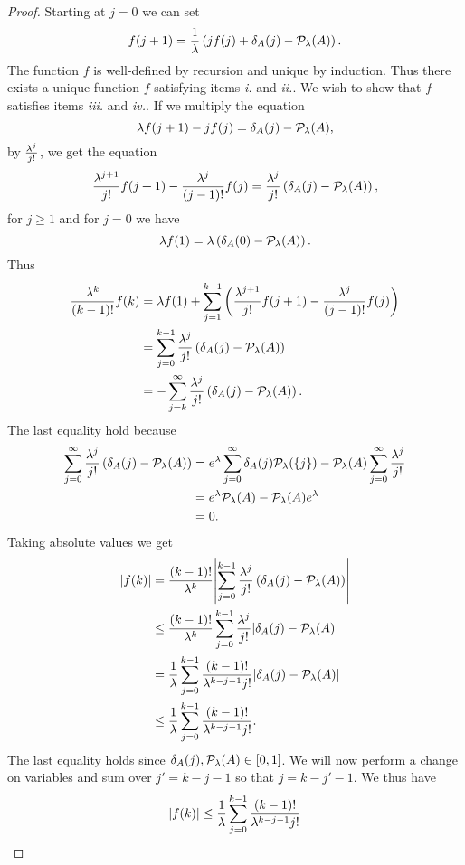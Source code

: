 \begin{proof}
    Starting at $j=0$ we can set 
    \[f(j+1) = \frac{1}{\lambda} \left(j f(j) +\delta_A(j)-{\mathcal{P}}_\lambda(A)\right). \]
    The function $f$ is well-defined by recursion and unique by induction. Thus there exists a unique function $f$ satisfying items \emph{i.} and \emph{ii.}. We wish to show that $f$ satisfies items \emph{iii.} and \emph{iv.}. If we multiply the equation 
    \[ \lambda f(j+1)-jf(j) = \delta_A(j)-{\mathcal{P}}_\lambda(A),\]
    by $\frac{\lambda^j}{j!}$, we get the equation 
    \[\frac{\lambda^{j+1}}{j!}f(j+1) - \frac{\lambda^j}{(j-1)!}f(j) = \frac{\lambda^j}{j!}\left(\delta_A(j)-{\mathcal{P}}_\lambda(A)\right), \]
    for $j \ge 1$ and for $j=0$ we have
    \[\lambda f(1)=\lambda \left(\delta_A(0)-{\mathcal{P}}_\lambda(A)\right). \]
    Thus 
    \begin{align*}
        \frac{\lambda^k}{(k-1)!}f(k)&=\lambda f(1)+\sum_{j=1}^{k-1} \left(\frac{\lambda^{j+1}}{j!}f(j+1)-\frac{\lambda^j}{(j-1)!} f(j)\right)\\
        &=\sum_{j=0}^{k-1} \frac{\lambda^j}{j!}\left(\delta_A(j)-{\mathcal{P}}_\lambda(A)\right)\\
        &=-\sum_{j=k}^\infty \frac{\lambda^j}{j!}\left(\delta_A(j)-{\mathcal{P}}_\lambda(A)\right).
    \end{align*}
    The last equality hold because  
    \begin{align*}
        \sum_{j=0}^\infty \frac{\lambda^j}{j!}\left(\delta_A(j)-{\mathcal{P}}_\lambda(A)\right)&=e^\lambda \sum_{j=0}^\infty \delta_A(j){\mathcal{P}}_\lambda(\{j\}) - {\mathcal{P}}_\lambda(A)\sum_{j=0}^\infty \frac{\lambda^j}{j!}\\
        &=e^\lambda {\mathcal{P}}_\lambda(A) - {\mathcal{P}}_\lambda(A)e^{\lambda}\\
        &=0.
    \end{align*}
    Taking absolute values we get
    \begin{align*}
        {\left\lvert f(k)\right\rvert} &= \frac{(k-1)!}{\lambda^k}{\left\lvert\sum_{j=0}^{k-1}\frac{\lambda^j}{j!}\left(\delta_A(j)-{\mathcal{P}}_\lambda(A)\right)\right\rvert}\\
        &\le\frac{(k-1)!}{\lambda^k}\sum_{j=0}^{k-1}\frac{\lambda^j}{j!}{\left\lvert\delta_A(j)-{\mathcal{P}}_\lambda(A)\right\rvert}\\
        &=\frac{1}{\lambda}\sum_{j=0}^{k-1}\frac{(k-1)!}{\lambda^{k-j-1}j!}{\left\lvert\delta_A(j)-{\mathcal{P}}_\lambda(A)\right\rvert}\\
        &\le \frac{1}{\lambda}\sum_{j=0}^{k-1}\frac{(k-1)!}{\lambda^{k-j-1}j!}.
    \end{align*}
    The last equality holds since $\delta_A(j),{\mathcal{P}}_\lambda(A) \in [0,1]$. We will now perform a change on variables and sum over $j' = k-j-1$ so that $j =k-j'-1$. We thus have
    \begin{align*}
        \abs{f(k)}&\le \frac{1}{\la}\sum_{j=0}^{k-1}\frac{(k-1)!}{\la^{k-j-1}j!}\\

\end{align*}
\end{proof}
